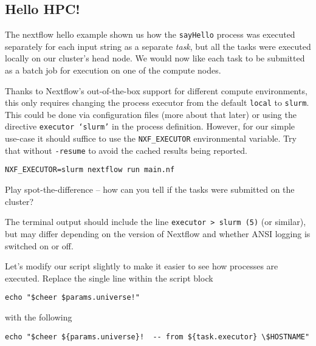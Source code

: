 \subsection{Hello HPC!}

The nextflow hello example shown us how the \texttt{sayHello} process was executed separately for each input string as a separate \emph{task}, but all the tasks were executed locally on our cluster's head node. 
We would now like each task to be submitted as a batch job for execution on one of the compute nodes.

Thanks to Nextflow's out-of-the-box support for different compute environments, 
this only requires changing the process executor from the default \texttt{local} to \texttt{slurm}.
This could be done via configuration files (more about that later) or using the directive \texttt{executor `slurm'} in the process definition. 
However, for our simple use-case it should suffice to use the \texttt{NXF\_EXECUTOR} environmental variable. Try that without \texttt{-resume} to avoid the cached results being reported.


\begin{steps}
\begin{lstlisting}
NXF_EXECUTOR=slurm nextflow run main.nf
\end{lstlisting}
\end{steps}

\begin{questions}
Play spot-the-difference -- how can you tell if the tasks were submitted on the cluster?
\begin{answer}
The terminal output should include the line \texttt{executor >  slurm (5)} (or similar), 
but may differ depending on the version of Nextflow and whether ANSI logging is switched on or off.
\end{answer}
\end{questions}

\begin{steps}
Let's modify our script slightly to make it easier to see how processes are executed.
Replace the single line within the script block

\begin{verbatim}
echo "$cheer $params.universe!"
\end{verbatim}

with the following

\begin{verbatim}
echo "$cheer ${params.universe}!  -- from ${task.executor} \$HOSTNAME"
\end{verbatim}
\end{steps}


